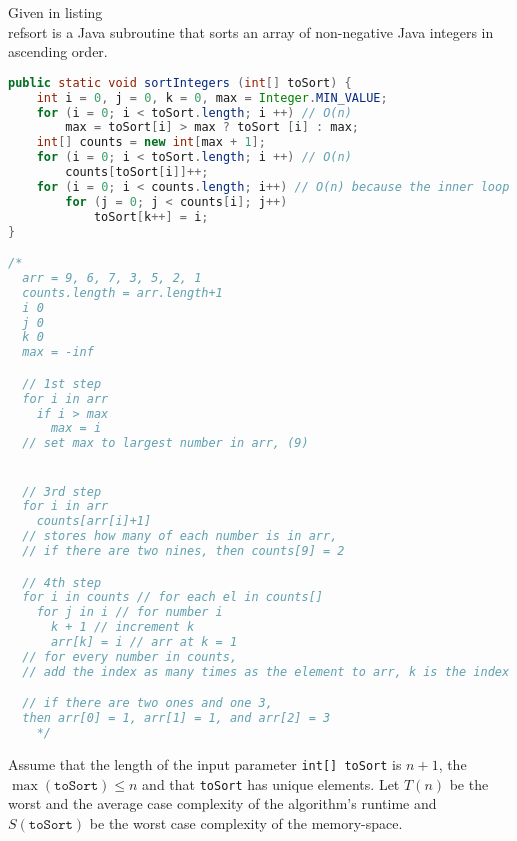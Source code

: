 \documentclass{homework}
\begin{document}
\question Given in listing \\ref{sort} is a Java subroutine that sorts an
array of non-negative Java integers in ascending order.

\begin{lstlisting}[language=java]
public static void sortIntegers (int[] toSort) {
    int i = 0, j = 0, k = 0, max = Integer.MIN_VALUE;
    for (i = 0; i < toSort.length; i ++) // O(n)
        max = toSort[i] > max ? toSort [i] : max;
    int[] counts = new int[max + 1];
    for (i = 0; i < toSort.length; i ++) // O(n)
        counts[toSort[i]]++;
    for (i = 0; i < counts.length; i++) // O(n) because the inner loop runs (int) counts[i] so its considered a constant
        for (j = 0; j < counts[i]; j++)
            toSort[k++] = i;
}

/*
  arr = 9, 6, 7, 3, 5, 2, 1
  counts.length = arr.length+1
  i 0
  j 0
  k 0
  max = -inf

  // 1st step
  for i in arr
    if i > max  
      max = i
  // set max to largest number in arr, (9)


  // 3rd step
  for i in arr
    counts[arr[i]+1] 
  // stores how many of each number is in arr, 
  // if there are two nines, then counts[9] = 2

  // 4th step
  for i in counts // for each el in counts[]
    for j in i // for number i
      k + 1 // increment k
      arr[k] = i // arr at k = 1
  // for every number in counts, 
  // add the index as many times as the element to arr, k is the index

  // if there are two ones and one 3, 
  then arr[0] = 1, arr[1] = 1, and arr[2] = 3
    */
\end{lstlisting}

Assume that the length of the input parameter \texttt{int[]
  toSort} is $n + 1$, the ${\max(\texttt{toSort}) \leq n}$ and that
\texttt{toSort} has unique elements. Let $T(n)$ be the worst and
the average case complexity of the algorithm's runtime and
$S(\texttt{toSort})$ be the worst case complexity of the
memory-space.
\end{document}
